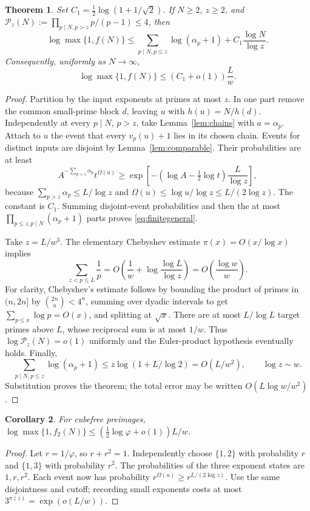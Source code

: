 \documentclass[11pt,a4paper]{article}
\newtheorem{theorem}{Theorem}[section]
\newtheorem{corollary}[theorem]{Corollary}
\theoremstyle{remark}
\newcommand{\PP}{\mathcal P}
\begin{document}
\begin{theorem}\label{thm:general}
Set $C_1=\tfrac12\log(1+1/\sqrt2)$. If $N\ge2$, $z\ge2$, and
$\PP_z(N):=\prod_{p\mid N,p>z}p/(p-1)\le4$, then
\begin{equation}\label{eq:finitegeneral}
 \log\max\{1,f(N)\}\le
 \sum_{p\mid N,p\le z}\log(\alpha_p+1)+C_1\frac{\log N}{\log z}.
\end{equation}
Consequently, uniformly as $N\to\infty$,
\[
 \log\max\{1,f(N)\}\le(C_1+o(1))\frac{L}{w}.
\]
\end{theorem}
\begin{proof}
Partition by the input exponents at primes at most $z$. In one part remove
the common small-prime block $d$, leaving $u$ with $h(u)=N/h(d)$.
Independently at every $p\mid N$, $p>z$, take Lemma~\ref{lem:chains} with
$a=\alpha_p$. Attach to $u$ the event that every $v_p(u)+1$ lies in its
chosen chain. Events for distinct inputs are disjoint by
Lemma~\ref{lem:comparable}. Their probabilities are at least
\[
 A^{-\sum_{p>z}\alpha_p}t^{\Omega(u)}
 \ge\exp\left[-\left(\log A-\tfrac12\log t\right)
                   \frac{L}{\log z}\right],
\]
because $\sum_{p>z}\alpha_p\le L/\log z$ and
$\Omega(u)\le\log u/\log z\le L/(2\log z)$. The constant is $C_1$.
Summing disjoint-event probabilities and then the at most
$\prod_{p\le z,p\mid N}(\alpha_p+1)$ parts proves \eqref{eq:finitegeneral}.

Take $z=L/w^3$. The elementary Chebyshev estimate
$\pi(x)=O(x/\log x)$ implies
\[
 \sum_{z<p\le L}\frac1p
 =O\left(\frac1w+\log\frac{\log L}{\log z}\right)
 =O\left(\frac{\log w}{w}\right).
\]
For clarity, Chebyshev's estimate follows by bounding the product of primes
in $(n,2n]$ by $\binom{2n}{n}<4^n$, summing over dyadic intervals to get
$\sum_{p\le x}\log p=O(x)$, and splitting at $\sqrt x$.
There are at most $L/\log L$ target primes above $L$, whose reciprocal
sum is at most $1/w$. Thus $\log\PP_z(N)=o(1)$ uniformly and the
Euler-product hypothesis eventually holds. Finally,
\[
 \sum_{p\mid N,p\le z}\log(\alpha_p+1)
 \le z\log(1+L/\log2)=O(L/w^2),\qquad \log z\sim w.
\]
Substitution proves the theorem; the total error may be written
$O(L\log w/w^2)$.
\end{proof}

\begin{corollary}
For cubefree preimages, $\log\max\{1,f_2(N)\}
\le(\tfrac12\log\varphi+o(1))L/w$.
\end{corollary}
\begin{proof}
Let $r=1/\varphi$, so $r+r^2=1$. Independently choose $\{1,2\}$ with
probability $r$ and $\{1,3\}$ with probability $r^2$. The probabilities of
the three exponent states are $1,r,r^2$. Each event now has probability
$r^{\Omega(u)}\ge r^{L/(2\log z)}$. Use the same disjointness and cutoff;
recording small exponents costs at most $3^{\pi(z)}=\exp(o(L/w))$.
\end{proof}
\end{document}
